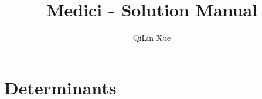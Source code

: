\documentclass{article}
\title{Medici - Solution Manual}
\author{QiLin Xue}
\date{}
\begin{document}
\maketitle


% 
% 
% 
% 
% 
% 
% 
% 
% 
\section{Determinants}



















\end{document}
